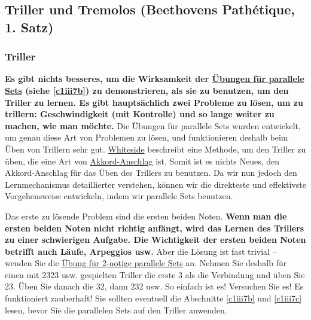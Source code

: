 
\subsection{Triller und Tremolos (Beethovens Pathétique, 1. Satz)}
\label{c1iii3}

\subsubsection{Triller}

\textbf{Es gibt nichts besseres, um die Wirksamkeit der \hyperref[c1iii7b]{Übungen für parallele Sets} (siehe \autoref{c1iii7b}) zu demonstrieren, als sie zu benutzen, um den Triller zu lernen.
Es gibt hauptsächlich zwei Probleme zu lösen, um zu trillern: Geschwindigkeit (mit Kontrolle) und so lange weiter zu machen, wie man möchte.}
Die Übungen für parallele Sets wurden entwickelt, um genau diese Art von Problemen zu lösen, und funktionieren deshalb beim Üben von Trillern sehr gut.
\hyperref[Whiteside]{Whiteside} beschreibt eine Methode, um den Triller zu üben, die eine Art von \hyperref[c1ii9]{Akkord-Anschlag} ist.
Somit ist es nichts Neues, den Akkord-Anschlag für das Üben des Trillers zu benutzen.
Da wir nun jedoch den Lernmechanismus detaillierter verstehen, können wir die direkteste und effektivste Vorgehensweise entwickeln, indem wir parallele Sets benutzen.

Das erste zu lösende Problem sind die ersten beiden Noten.
\textbf{Wenn man die ersten beiden Noten nicht richtig anfängt, wird das Lernen des Trillers zu einer schwierigen Aufgabe.
Die Wichtigkeit der ersten beiden Noten betrifft auch Läufe, Arpeggios usw.}
Aber die Lösung ist fast trivial -- wenden Sie die \hyperref[c1iii7b2]{Übung für 2-notige parallele Sets} an.
Nehmen Sie deshalb für einen mit 2323 usw. gespielten Triller die erste 3 als die Verbindung und üben Sie 23.
Üben Sie danach die 32, dann 232 usw.
So einfach ist es! Versuchen Sie es! Es funktioniert zauberhaft!
Sie sollten eventuell die Abschnitte \hyperref[c1iii7b]{\autoref{c1iii7b}} und \hyperref[c1iii7c]{\autoref{c1iii7c}} lesen, bevor Sie die parallelen Sets auf den Triller anwenden.

